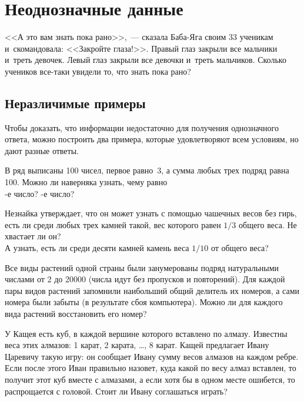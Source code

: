 
\section*{Неоднозначные данные}



\begin{flushright}
<<А это вам знать пока рано>>,~--- сказала Баба-Яга своим 33 ученикам
и~скомандовала:
<<Закройте глаза!>>.
Правый глаз закрыли все мальчики и~треть девочек.
Левый глаз закрыли все девочки и~треть мальчиков.
Сколько учеников все-таки увидели то, что знать пока рано?
\end{flushright}

\subsection*{Неразличимые примеры}

Чтобы доказать, что информации недостаточно для получения однозначного ответа,
можно построить два примера, которые удовлетворяют всем условиям, но дают
разные ответы.

\begin{problems}

\item
В ряд выписаны 100 чисел, первое равно~3, а сумма любых трех подряд равна 100.
Можно ли наверняка узнать, чему равно
\\
-е число?
\quad
{}-е число?

\item
\subproblem
Незнайка утверждает, что он может узнать с помощью чашечных весов без гирь,
есть ли среди любых трех камней такой, вес которого равен $1/3$ общего веса.
Не хвастает ли он?
\\
\subproblem
А узнать, есть ли среди десяти камней камень веса $1/10$ от общего веса?

\item
Все виды растений одной страны были занумерованы подряд натуральными числами
от 2 до 20000 (числа идут без пропусков и повторений).
Для каждой пары видов растений запомнили наибольший общий делитель их номеров,
а сами номера были забыты (в результате сбоя компьютера).
Можно ли для каждого вида растений восстановить его номер?

\item
У Кащея есть куб, в каждой вершине которого вставлено по алмазу.
Известны веса этих алмазов: 1 карат, 2 карата, \ldots, 8 карат.
Кащей предлагает Ивану Царевичу такую игру: он сообщает Ивану сумму весов
алмазов на каждом ребре.
Если после этого Иван правильно назовет, куда какой по весу алмаз вставлен,
то получит этот куб вместе с алмазами, а если хотя бы в одном месте ошибется,
то распрощается с головой.
Стоит ли Ивану соглашаться играть?

\end{problems}


